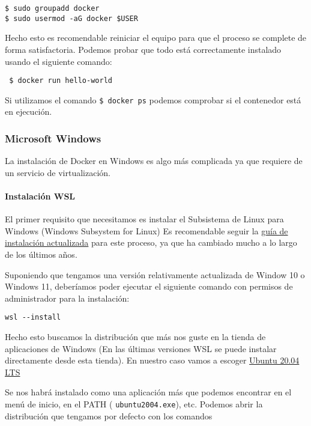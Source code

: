 \begin{verbatim}
$ sudo groupadd docker
$ sudo usermod -aG docker $USER
\end{verbatim}

Hecho esto es recomendable reiniciar el equipo para que el proceso se
complete de forma satisfactoria. Podemos probar que todo está
correctamente instalado usando el siguiente comando:

\begin{verbatim}
 $ docker run hello-world
\end{verbatim}

Si utilizamos el comando \texttt{\$\ docker\ ps} podemos comprobar si el
contenedor está en ejecución.

\hypertarget{microsoft-windows}{%
\subsubsection{Microsoft Windows}\label{microsoft-windows}}

La instalación de Docker en Windows es algo más complicada ya que
requiere de un servicio de virtualización.

\hypertarget{instalaciuxf3n-wsl}{%
\paragraph{Instalación WSL}\label{instalaciuxf3n-wsl}}

El primer requisito que necesitamos es instalar el Subsistema de Linux
para Windows (Windows Subsystem for Linux) Es recomendable seguir la
\href{https://docs.microsoft.com/en-us/windows/wsl/install}{guía de
instalación actualizada} para este proceso, ya que ha cambiado mucho a
lo largo de los últimos años.

Suponiendo que tengamos una versión relativamente actualizada de Window
10 o Windows 11, deberíamos poder ejecutar el siguiente comando con
permisos de administrador para la instalación:

\begin{verbatim}
wsl --install
\end{verbatim}


Hecho esto buscamos la distribución que más nos guste en la tienda de
aplicaciones de Windows (En las últimas versiones WSL se puede instalar
directamente desde esta tienda). En nuestro caso vamos a escoger
\href{https://www.microsoft.com/store/productId/9N6SVWS3RX71}{Ubuntu
20.04 LTS}

Se nos habrá instalado como una aplicación más que podemos encontrar en
el menú de inicio, en el PATH ( \texttt{ubuntu2004.exe}), etc. Podemos
abrir la distribución que tengamos por defecto con los comandos

